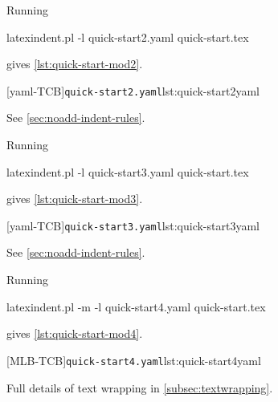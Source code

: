 \documentclass[10pt]{article}
\begin{document}
 \begin{example}
 Running

 \begin{commandshell}
latexindent.pl -l quick-start2.yaml quick-start.tex
\end{commandshell}

 gives \cref{lst:quick-start-mod2}.

 \begin{cmhtcbraster}
  [yaml-TCB]{\texttt{quick-start2.yaml}}{lst:quick-start2yaml}
 \end{cmhtcbraster}
 See \cref{sec:noadd-indent-rules}.
 \end{example}

 \begin{example}
 Running

 \begin{commandshell}
latexindent.pl -l quick-start3.yaml quick-start.tex
\end{commandshell}

 gives \cref{lst:quick-start-mod3}.

 \begin{cmhtcbraster}
  [yaml-TCB]{\texttt{quick-start3.yaml}}{lst:quick-start3yaml}
 \end{cmhtcbraster}
 See \cref{sec:noadd-indent-rules}.
 \end{example}

 \begin{example}
 Running

 \begin{commandshell}
latexindent.pl -m -l quick-start4.yaml quick-start.tex
\end{commandshell}

 gives \cref{lst:quick-start-mod4}.

 \begin{cmhtcbraster}
  [MLB-TCB]{\texttt{quick-start4.yaml}}{lst:quick-start4yaml}
 \end{cmhtcbraster}
 Full details of text wrapping in \cref{subsec:textwrapping}.
 \end{example}
\end{document}
